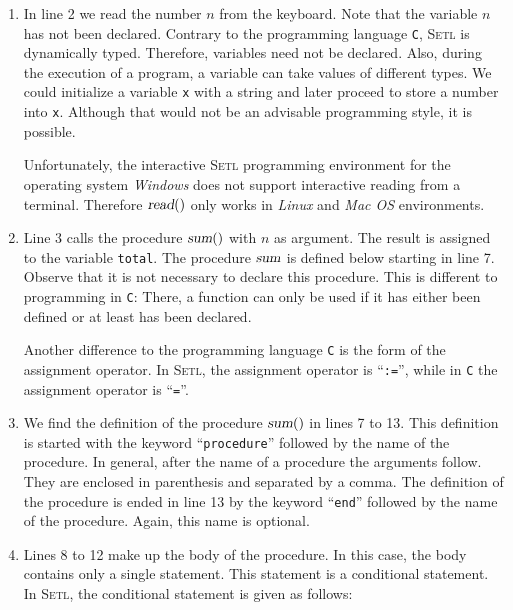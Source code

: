 \begin{enumerate}
\item In line 2 we read the number $n$ from the keyboard.
      Note that the variable $n$ has not been declared.  Contrary to the programming
      language \texttt{C}, \textsc{Setl} is dynamically typed.  Therefore, variables need
      not be declared.  Also, during the execution of a program, a variable can take
      values of different types.  We could initialize a variable \texttt{x} with a string
      and later proceed to store a number into \texttt{x}.   Although that would not be an
      advisable programming style, it is possible.

      Unfortunately, the interactive \textsc{Setl} programming environment for the operating system
      \textsl{Windows} does not support interactive reading from a terminal.
      Therefore $\textsl{read}()$ only works in \textsl{Linux} and \textsl{Mac OS} environments.
\item Line 3 calls the procedure $\textsl{sum}()$ with $n$ as argument.  The result is
      assigned to the variable \texttt{total}.  The procedure $\textsl{sum}$ is defined
      below starting in line 7.  Observe that it is not necessary to declare this procedure.
      This is different to programming in \texttt{C}:  There, a function can only be used
      if it has either been defined or at least has been declared.

      Another difference to the programming language \texttt{C} is the form of the
      assignment operator.  In \textsc{Setl}, the assignment operator is ``\texttt{:=}'',
      while in \texttt{C} the assignment operator is ``\texttt{=}''.
\item We find the definition of the procedure $\textsl{sum}()$ in lines 7 to 13.
      This definition is started with the keyword ``\texttt{procedure}'' followed by the
      name of the procedure.   In general, after the name of a procedure the arguments follow.
      They are enclosed in parenthesis and separated by a comma.
      The definition of the procedure is ended in line 13 by the keyword ``\texttt{end}''
      followed by the name of the procedure.  Again, this name is optional.

\item Lines 8 to 12 make up the body of the procedure.
      In this case, the body contains only a single statement. This statement is a
      conditional statement. In \textsc{Setl}, the  conditional statement is given as
      follows: 
      \pagebreak


\end{enumerate}
